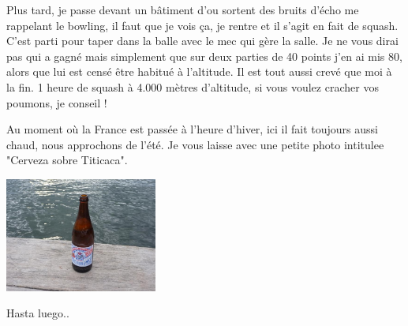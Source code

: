 \begin{multicols}{2}
Plus tard, je passe devant un bâtiment d'ou sortent des bruits d'écho me rappelant le bowling, il faut que je vois ça, je rentre et il s'agit en fait de squash. C'est parti pour taper dans la balle avec le mec qui gère la salle. Je ne vous dirai pas qui a gagné mais simplement que sur deux parties de 40 points j'en ai mis 80, alors que lui est censé être habitué à l'altitude. Il est tout aussi crevé que moi à la fin. 1 heure de squash à 4.000 mètres d'altitude, si vous voulez cracher vos poumons, je conseil !

Au moment où la France est passée à l'heure d'hiver, ici il fait toujours aussi chaud, nous approchons de l'été. Je vous laisse avec une petite photo intitulee "Cerveza sobre Titicaca".

\smallbreak
\hspace*{-0.65cm}
\includegraphics[width=5cm]{articles/Arequipa-colca-titicaca/1256606978ASqj.jpg}
\smallbreak

Hasta luego..

\end{multicols}


